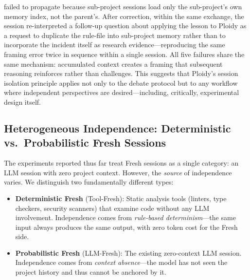 \documentclass[11pt]{article}
\begin{document}
failed to propagate because sub-project sessions load only the sub-project's own memory index, not the parent's. After correction, within the same exchange, the session re-interpreted a follow-up question about applying the lesson to Ploidy as a request to duplicate the rule-file into sub-project memory rather than to incorporate the incident itself as research evidence---reproducing the same framing error twice in sequence within a single session. All five failures share the same mechanism: accumulated context creates a framing that subsequent reasoning reinforces rather than challenges. This suggests that Ploidy's session isolation principle applies not only to the debate protocol but to any workflow where independent perspectives are desired---including, critically, experimental design itself.


\subsection{Heterogeneous Independence: Deterministic vs.\ Probabilistic Fresh Sessions}
\label{sec:heterogeneous}

The experiments reported thus far treat Fresh sessions as a single category: an LLM session with zero project context. However, the \emph{source} of independence varies. We distinguish two fundamentally different types:

\begin{itemize}[leftmargin=1.5em]
  \item \textbf{Deterministic Fresh} (Tool-Fresh): Static analysis tools (linters, type checkers, security scanners) that examine code without any LLM involvement. Independence comes from \emph{rule-based determinism}---the same input always produces the same output, with zero token cost for the Fresh side.
  \item \textbf{Probabilistic Fresh} (LLM-Fresh): The existing zero-context LLM session. Independence comes from \emph{context absence}---the model has not seen the project history and thus cannot be anchored by it.
\end{itemize}
\end{document}
